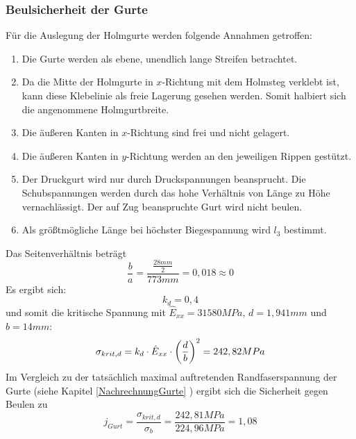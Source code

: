 \subsubsection{Beulsicherheit der Gurte}
Für die Auslegung der Holmgurte werden folgende Annahmen getroffen:
\begin{enumerate}
	\item Die Gurte werden als ebene, unendlich lange Streifen betrachtet.
	\item Da die Mitte der Holmgurte in $x$-Richtung mit dem Holmsteg verklebt ist, kann diese Klebelinie als freie Lagerung gesehen werden. Somit halbiert sich die angenommene Holmgurtbreite.
	\item Die äußeren Kanten in $x$-Richtung sind frei und nicht gelagert.
	\item Die äußeren Kanten in $y$-Richtung werden an den jeweiligen Rippen gestützt.
	\item Der Druckgurt wird nur durch Druckspannungen beansprucht. Die Schubspannungen werden durch das hohe Verhältnis von Länge zu  Höhe vernachlässigt. Der auf Zug beanspruchte Gurt wird nicht beulen.
	\item Als größtmögliche Länge bei höchster Biegespannung wird $l_{3}$ bestimmt.
\end{enumerate}
Das Seitenverhältnis beträgt 
\begin{equation}
	\frac{b}{a}=\frac{\frac{28 mm}{2}}{773 mm}=0,018 \approx 0
\end{equation}
\noindent Es ergibt sich:
\begin{equation}
	k_{d}=0,4
\end{equation}
und somit die kritische Spannung mit $\hat{E}_{xx}=31580MPa$, $d=1,941mm$ und $b=14mm$:
\begin{equation}
	\sigma_{krit,d}=k_{d}\cdot \hat{E}_{xx}\cdot\biggl(\frac{d}{b}\biggr)^{2}\\
	= 242,82 MPa
\end{equation}
Im Vergleich zu der tatsächlich maximal auftretenden Randfaserspannung der Gurte (siehe Kapitel \ref{NachrechnungGurte} ) ergibt sich die Sicherheit gegen Beulen zu 
\begin{equation}
	j_{Gurt}=\frac{\sigma_{krit,d}}{\sigma_{b}}=\frac{242,81 MPa}{224,96 MPa}=1,08
\end{equation}


